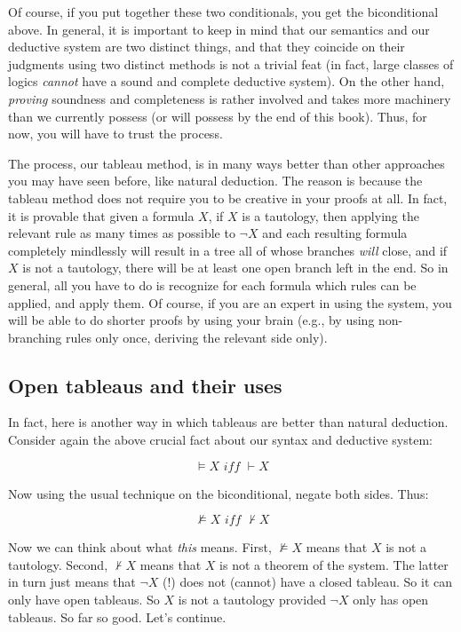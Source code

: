 Of course, if you put together these two conditionals, you get the biconditional above. In general, it is important to keep in mind that our semantics and our deductive system are two distinct things, and that they coincide on their judgments using two distinct methods is not a trivial feat (in fact, large classes of logics \textit{cannot} have a sound and complete deductive system). On the other hand, \textit{proving} soundness and completeness is rather involved and takes more machinery than we currently possess (or will possess by the end of this book). Thus, for now, you will have to trust the process. 

The process, our tableau method, is in many ways better than other approaches you may have seen before, like natural deduction. The reason is because the tableau method does not require you to be creative in your proofs at all. In fact, it is provable that given a formula $X$, if $X$ is a tautology, then applying the relevant rule as many times as possible to $ \neg X$ and each resulting formula completely mindlessly will result in a tree all of whose branches \textit{will} close, and if $X$ is not a tautology, there will be at least one open branch left in the end. So in general, all you have to do is recognize for each formula which rules can be applied, and apply them. Of course, if you are an expert in using the system, you will be able to do shorter proofs by using your brain (e.g., by using non-branching rules only once, deriving the relevant side only). 

\subsection{Open tableaus and their uses}

In fact, here is another way in which tableaus are better than natural deduction. Consider again the above crucial fact about our syntax and deductive system:

\[\models X \textit{ iff } \vdash X\]

Now using the usual technique on the biconditional, negate both sides. Thus: 

\[\not\models X \textit{ iff } \nvdash X\]

Now we can think about what \textit{this} means. First, $\not\models X$ means that $X$ is not a tautology. Second, $\nvdash X$ means that $X$ is not a theorem of the system. The latter in turn just means that $\neg X$ (!)  does not (cannot) have a closed tableau. So it can only have open tableaus. So $X$ is not a tautology provided $\neg X$ only has open tableaus. So far so good. Let's continue. 

